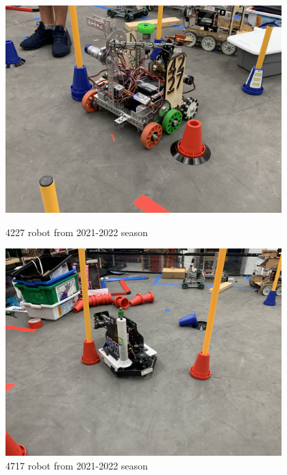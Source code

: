  
\begin{figure}[ht]
\centering
\begin{minipage}[b]{.48\textwidth}
  \centering
  \includegraphics[width=0.95\textwidth]{Meetings/September/09-22-22/9-22-22_Hardware_Figure1.JPG}
  \caption{4227 robot from 2021-2022 season}
  \label{fig:pic1}
\end{minipage}%
\hfill%
\begin{minipage}[b]{.48\textwidth}
  \centering
  \includegraphics[width=0.95\textwidth]{Meetings/September/09-22-22/9-22-22_Hardware_Figure2.JPG}
  \caption{4717 robot from 2021-2022 season}
  \label{fig:pic2}
\end{minipage}
\end{figure}


